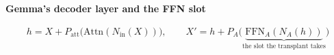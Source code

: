 \documentclass[border=40pt]{standalone}
\begin{document}
\begin{minipage}{26cm}
{\sffamily\bfseries\Large\color{muted} Gemma's decoder layer and the FFN slot}\par\vspace{-14pt}
{\LARGE
\begin{gather*}
h = X + P_{\mathrm{att}}\big(\mathrm{Attn}(N_{\mathrm{in}}(X))\big), \qquad
X' = h + P_A\Big(\underbrace{\mathrm{FFN}_A(N_A(h))}_{\text{the slot the transplant takes}}\Big)
\end{gather*}}
\end{minipage}
\end{document}

